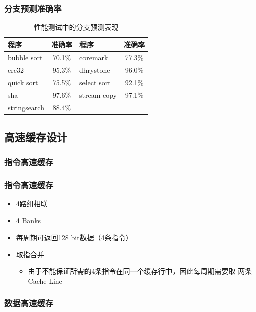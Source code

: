 \documentclass{beamer}
\begin{document}
\begin{frame}
    \frametitle{分支预测准确率}
    \begin{table}
        \centering
        \caption{性能测试中的分支预测表现}
        \begin{tabular}{lc|lc}
            \toprule
            程序 & 准确率 & 程序 & 准确率\\
            \midrule
            bubble sort & 70.1\% & coremark & 77.3\% \\
            crc32 & 95.3\% & dhrystone & 96.0\% \\
            quick sort & 75.5\% & select sort & 92.1\% \\
            sha & 97.6\% & stream copy & 97.1\% \\
            stringsearch & 88.4\% \\
            \bottomrule
        \end{tabular}
    \end{table}
\end{frame}

\subsection{高速缓存设计}

\subsubsection{指令高速缓存}

\begin{frame}
    \frametitle{指令高速缓存}

    \begin{itemize}
        \item 4路组相联
        \item 4 Banks
        \item 每周期可返回128 bit数据（4条指令）
        \item 取指合并\begin{itemize}
            \item 由于不能保证所需的4条指令在同一个缓存行中，因此每周期需要取
                  两条Cache Line
        \end{itemize}
    \end{itemize}

\end{frame}

\subsubsection{数据高速缓存}
\end{document}
